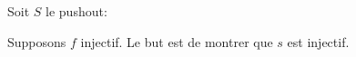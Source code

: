 \documentclass{article}
\begin{document}
Soit $S$ le pushout:
\begin{center}
\end{center}
Supposons $f$ injectif. Le but est de montrer que $s$ est injectif. 
\end{document}
